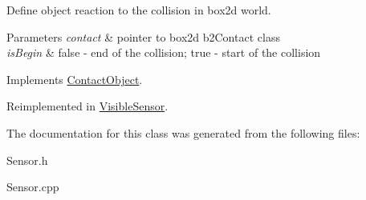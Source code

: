 Define object reaction to the collision in box2d world. 


\begin{DoxyParams}{Parameters}
{\em contact} & pointer to box2d b2\+Contact class \\
\hline
{\em is\+Begin} & \textquotesingle{}false\textquotesingle{} -\/ end of the collision; \textquotesingle{}true\textquotesingle{} -\/ start of the collision \\
\hline
\end{DoxyParams}


Implements \hyperlink{class_contact_object_a53d2dfc1d9c2821e9c62e80ce62a6435}{Contact\+Object}.



Reimplemented in \hyperlink{class_visible_sensor_a63bcb9da7556a6356cca3b08f7808bd8}{Visible\+Sensor}.



The documentation for this class was generated from the following files\+:\begin{DoxyCompactItemize}
\item 
Sensor.\+h\item 
Sensor.\+cpp\end{DoxyCompactItemize}
